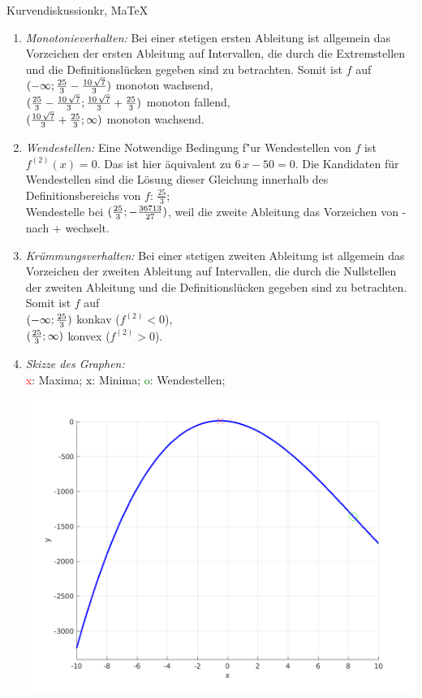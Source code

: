 \begin{MAufgabe}{Kurvendiskussion}{kr, MaTeX}
\begin{enumerate}
 \item \emph{Monotonieverhalten:} 
 Bei einer stetigen ersten Ableitung ist allgemein das Vorzeichen der ersten Ableitung auf Intervallen, die durch die Extremstellen und die Definitionsl\"ucken gegeben sind zu betrachten. Somit ist $f$ auf \\ 
 $(-\infty;\frac{25}{3} - \frac{10\, \sqrt{7}}{3})$ monoton wachsend, \\ 
 $(\frac{25}{3} - \frac{10\, \sqrt{7}}{3};\frac{10\, \sqrt{7}}{3} + \frac{25}{3})$ monoton  fallend, \\ 
 $(\frac{10\, \sqrt{7}}{3} + \frac{25}{3}; \infty)$ monoton wachsend. \\ 
 \item \emph{Wendestellen:} 
 Eine Notwendige Bedingung f"ur Wendestellen von $f$ ist $f^{(2)}(x)=0$. 
 Das ist hier \"aquivalent zu $6\, x - 50=0$. 
 Die Kandidaten f\"ur Wendestellen sind die L\"osung dieser Gleichung innerhalb des Definitionsbereichs von $f$: $\frac{25}{3}$; \\ 
 Wendestelle bei $(\frac{25}{3};- \frac{36713}{27})$, weil die zweite Ableitung das Vorzeichen von - nach + wechselt. \\ 
 \item \emph{Kr\"ummungsverhalten:} 
 Bei einer stetigen zweiten Ableitung ist allgemein das Vorzeichen der zweiten Ableitung auf Intervallen, die durch die Nullstellen der zweiten Ableitung und die Definitionsl\"ucken gegeben sind zu betrachten. 
 Somit ist $f$ auf \\ 
 $(-\infty ;\frac{25}{3})$  konkav ($f^{(2)}<0$), \\ 
 $(\frac{25}{3}; \infty)$  konvex ($f^{(2)}>0$). \\ 
 \item \emph{Skizze des Graphen:} \\ 
 {\textcolor{red} x}: Maxima; {\textcolor{black} x}: Minima; {\textcolor{green} o}: Wendestellen; 
  \begin{center}
  \includegraphics[width=0.8\linewidth]{Abb_zur_Ag_autogenerated_fractions_5.png} \end{center}
  
 \end{enumerate}
 \else\relax\fi
  \end{MAufgabe}